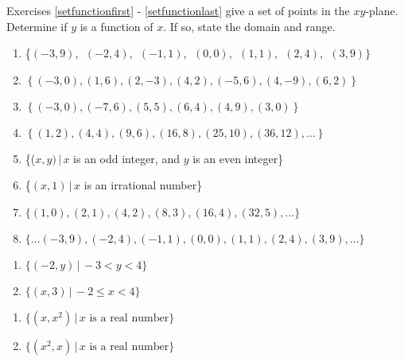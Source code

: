 Exercises \ref{setfunctionfirst} - \ref{setfunctionlast} give a set of points in the $xy$-plane.    Determine if $y$ is a function of $x$.  If so, state the domain and range.

\begin{enumerate}

\setcounter{enumi}{\value{HW}}

\item \{$(-3, 9)$, $\;(-2, 4)$, $\;(-1, 1)$, $\;(0, 0)$, $\;(1, 1)$, $\;(2, 4)$, $\;(3, 9)\}$ \label{setfunctionfirst}
\item  $\left\{ (-3,0), (1,6), (2, -3), (4,2), (-5,6), (4, -9), (6,2) \right\}$
\item  $\left\{ (-3,0), (-7,6), (5,5), (6,4), (4,9), (3,0) \right\}$
\item  $\left\{ (1,2), (4,4), (9,6), (16,8), (25,10), (36, 12), \ldots \right\}$
\item \{($x, y) \, | \, x$ is an odd integer, and $y$ is an even integer\}
\item \{$(x, 1) \, | \, x$ is an irrational number\}

\item $\{ (1,0), (2,1), (4,2), (8,3), (16,4), (32, 5), \ldots \}$
\item $\{ \ldots (-3,9), (-2,4), (-1,1), (0,0), (1,1), (2,4), (3,9), \ldots \}$

\setcounter{HW}{\value{enumi}}
\end{enumerate}

\vspace{-0.1in}

\begin{multicols}{2}
\begin{enumerate}
\setcounter{enumi}{\value{HW}}

\item $\{ (-2, y) \, | \, -3 < y < 4\}$
\item  $\{ (x,3) \, | \,  -2 \leq x < 4\}$

\setcounter{HW}{\value{enumi}}
\end{enumerate}
\end{multicols}

\begin{multicols}{2}
\begin{enumerate}
\setcounter{enumi}{\value{HW}}


\item  $\{ \left(x,x^2\right) \, | \, \text{$x$ is a real number} \}$
\item  $\{ \left(x^2,x\right) \, | \, \text{$x$ is a real number} \}$ \label{setfunctionlast}

\setcounter{HW}{\value{enumi}}
\end{enumerate}
\end{multicols}


